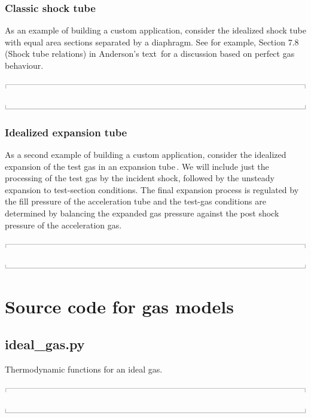 \documentclass[10pt,a4paper]{article}
\newcommand{\topbar}{\ensuremath{
    \rule{0.1mm}{2.0mm} \rule[2.0mm]{159.5mm}{0.1mm} \rule{0.1mm}{2.0mm}
}}
\newcommand{\bottombar}{\ensuremath{
    \rule{0.1mm}{2.0mm} \rule{159.5mm}{0.1mm} \rule{0.1mm}{2.0mm}
}}
\begin{document}
\subsubsection*{Classic shock tube}
%
As an example of building a custom application, consider the idealized shock tube 
with equal area sections separated by a diaphragm.
See for example, Section 7.8 (Shock tube relations) in Anderson's text\,\cite{anderson_82}
for a discussion based on perfect gas behaviour.

\medskip
\noindent\topbar

\bottombar

\bigskip
\subsubsection*{Idealized expansion tube}
%
As a second example of building a custom application, consider the idealized expansion
of the test gas in an expansion tube\,\cite{trimpi_62}.
We will include just the processing of the test gas by the incident shock,
followed by the unsteady expansion to test-section conditions. 
The final expansion process is regulated by the fill pressure of the acceleration tube
and the test-gas conditions are determined by balancing the expanded gas pressure against
the post shock pressure of the acceleration gas.

\medskip
\noindent\topbar

\bottombar


\newpage




\newpage
\appendix
\section{Source code for gas models}
%
\subsection{ideal\_gas.py}
\label{ideal-gas-py}
%
Thermodynamic functions for an ideal gas.

\noindent\topbar

\bottombar
\end{document}
